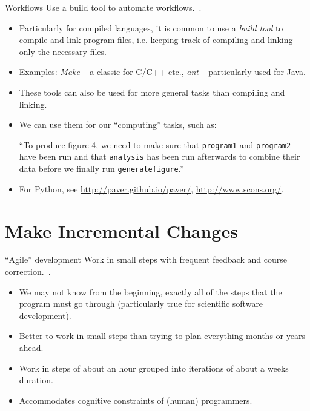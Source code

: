 \documentclass[english]{beamer}
\newcommand{\sectionslide}{\centering\vspace*{25mm}%
  {\bfseries\LARGE \insertsection}}
\begin{document}

\begin{frame}{\insertsection}{Workflows}
  \vspace{-2mm}
  Use a build tool to automate workflows.~\cite{Wilson2013}.
  \begin{itemize}
  \item Particularly for compiled languages, it is common to use a
    \emph{build tool} to compile and link program files, i.e. keeping
    track of compiling and linking only the necessary files.
  \item Examples: \emph{Make} -- a classic for C/C++ etc., \emph{ant}
    -- particularly used for Java.
  \item These tools can also be used for more general tasks than
    compiling and linking.
  \item We can use them for our ``computing'' tasks, such as:

    ``To produce figure 4, we need to make sure that \texttt{program1}
    and \texttt{program2} have been run and that \texttt{analysis} has
    been run afterwards to combine their data before we finally run
    \texttt{generate\textunderscore{}figure}.''
  \item For Python, see \url{http://paver.github.io/paver/},
    \url{http://www.scons.org/}.
  \end{itemize}
\end{frame}


\section{Make Incremental Changes}

\begin{frame}
  \sectionslide
\end{frame}


\begin{frame}{\insertsection}{``Agile'' development}
  Work in small steps with frequent feedback and course
  correction.~\cite{Wilson2013}.
  \begin{itemize}
  \item We may not know from the beginning, exactly all of the steps
    that the program must go through (particularly true for
    scientific software development).
  \item Better to work in small steps than trying to plan everything
    months or years ahead.
  \item Work in steps of about an hour grouped into iterations of
    about a weeks duration.
  \item Accommodates cognitive constraints of (human) programmers.
  \end{itemize}
\end{frame}
\end{document}
